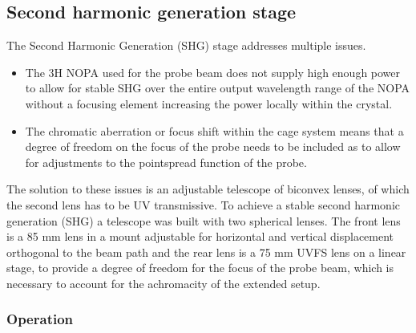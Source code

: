 \documentclass[twoside,openright]{scrreprt}
\begin{document}
\subsection{Second harmonic generation stage}\label{SHG-Stage-desc}
The Second Harmonic Generation (SHG) stage addresses multiple issues. 
\begin{itemize}
\item The 3H NOPA used for the probe beam does not supply high enough power to allow for stable SHG over the entire output wavelength range of the NOPA without a focusing element increasing the power locally within the crystal. 
\item The chromatic aberration or focus shift within the cage system means that a degree of freedom on the focus of the probe needs to be included as to allow for adjustments to the pointspread function of the probe.
\end{itemize}


The solution to these issues is an adjustable telescope of biconvex lenses, of which the second lens has to be UV transmissive. To achieve a stable second harmonic generation (SHG) a telescope was built with two spherical lenses. The front lens is a 85 mm lens in a mount adjustable for horizontal and vertical displacement orthogonal to the beam path and the rear lens is a 75 mm UVFS lens on a linear stage, to provide a degree of freedom for the focus of the probe beam, which is necessary to account for the achromacity of the extended setup.
\subsubsection{Operation}
\end{document}
